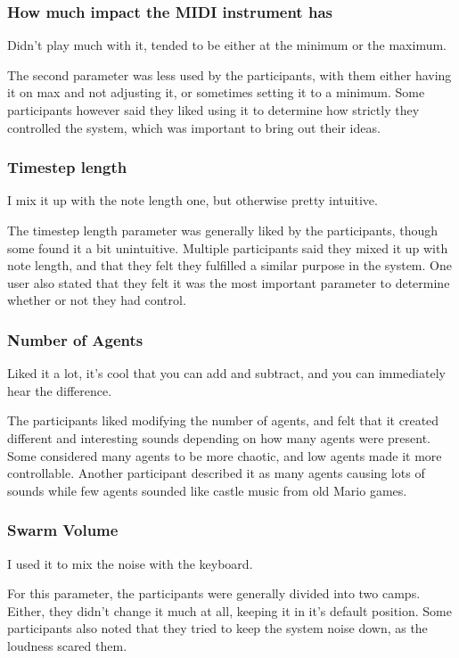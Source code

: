 \documentclass[a4paper,english]{report}
\begin{document}
	\subsubsection{How much impact the MIDI instrument has}
	\begin{displayquote}
		Didn't play much with it, tended to be either at the minimum or the maximum.
	\end{displayquote}
	The second parameter was less used by the participants, with them either having it on max and not adjusting it, or sometimes setting it to a minimum. Some participants however said they liked using it to determine how strictly they controlled the system, which was important to bring out their ideas.
	\subsubsection{Timestep length}
	\begin{displayquote}
		I mix it up with the note length one, but otherwise pretty intuitive.
	\end{displayquote}
	The timestep length parameter was generally liked by the participants, though some found it a bit unintuitive. Multiple participants said they mixed it up with note length, and that they felt they fulfilled a similar purpose in the system. One user also stated that they felt it was the most important parameter to determine whether or not they had control.
	\subsubsection{Number of Agents}
	\begin{displayquote}
		Liked it a lot, it's cool that you can add and subtract, and you can immediately hear the difference.
	\end{displayquote}
	The participants liked modifying the number of agents, and felt that it created different and interesting sounds depending on how many agents were present. Some considered many agents to be more chaotic, and low agents made it more controllable. Another participant described it as many agents causing lots of sounds while few agents sounded like castle music from old Mario games.
	\subsubsection{Swarm Volume}
	\begin{displayquote}
		I used it to mix the noise with the keyboard.
	\end{displayquote}
	For this parameter, the participants were generally divided into two camps. Either, they didn't change it much at all, keeping it in it's default position. Some participants also noted that they tried to keep the system noise down, as the loudness scared them.
\end{document}
